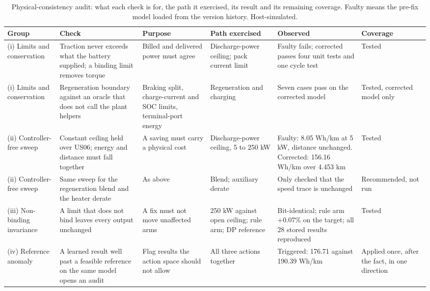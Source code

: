 \documentclass{ieeeaccess}
\begin{document}
\begin{table}[!t]
\centering
\caption{Physical-consistency audit: what each check is for, the path it exercised, its result and its remaining coverage. Faulty means the pre-fix model loaded from the version history. Host-simulated.}
\label{tab:plant-checks}
\footnotesize
\setlength{\tabcolsep}{3pt}
\renewcommand{\arraystretch}{1.15}
\begin{tabularx}{\textwidth}{@{}XXXXXX@{}}
\hline
\textbf{Group} & \textbf{Check} & \textbf{Purpose} & \textbf{Path exercised} & \textbf{Observed} & \textbf{Coverage} \\
\hline
(i) Limits and conservation & Traction never exceeds what the battery supplied; a binding limit removes torque & Billed and delivered power must agree & Discharge-power ceiling; pack current limit & Faulty fails; corrected passes four unit tests and one cycle test & Tested \\
(i) Limits and conservation & Regeneration boundary against an oracle that does not call the plant helpers & Braking split, charge-current and SOC limits, terminal-port energy & Regeneration and charging & Seven cases pass on the corrected model & Tested, corrected model only \\
(ii) Controller-free sweep & Constant ceiling held over US06; energy and distance must fall together & A saving must carry a physical cost & Discharge-power ceiling, 5 to 250 kW & Faulty: 8.05 Wh/km at 5 kW, distance unchanged. Corrected: 156.16 Wh/km over 4.453 km & Tested \\
(ii) Controller-free sweep & Same sweep for the regeneration blend and the heater derate & As above & Blend; auxiliary derate & Only checked that the speed trace is unchanged & Recommended, not run \\
(iii) Non-binding invariance & A limit that does not bind leaves every output unchanged & A fix must not move unaffected arms & 250 kW against open ceiling; rule arm; DP reference & Bit-identical; rule arm +0.07\% on the target; all 28 stored results reproduced & Tested \\
(iv) Reference anomaly & A learned result well past a feasible reference on the same model opens an audit & Flag results the action space should not allow & All three actions together & Triggered: 176.71 against 190.39 Wh/km & Applied once, after the fact, in one direction \\
\hline
\end{tabularx}
\end{table}
\end{document}
